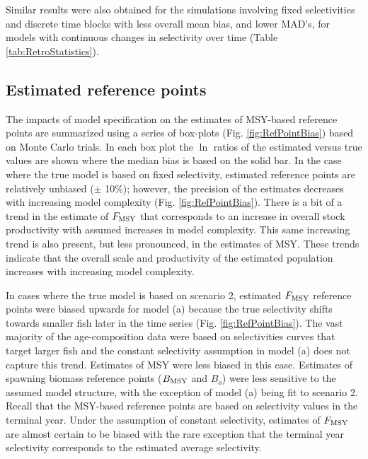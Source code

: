 Similar results were also obtained for the simulations involving fixed selectivities and discrete time blocks with less overall mean bias, and lower MAD's, for models with continuous changes in selectivity over time (Table \ref{tab:RetroStatistics}).




\subsection*{Estimated reference points} %
\label{sub:estimated_reference_points}


The impacts of model specification on the estimates of MSY-based reference points are summarized using a series of box-plots (Fig. \ref{fig:RefPointBias}) based on Monte Carlo trials.  In each box plot the $\ln$ ratios of the estimated versus true values are shown where the median bias is based on the solid bar.  In the case where the true model is based on fixed selectivity, estimated reference points are relatively unbiased ($\pm$ 10\%); however, the precision of the estimates decreases with increasing model complexity (Fig. \ref{fig:RefPointBias}).  There is a bit of a trend in the estimate of $F_{\rm{MSY}}$ that corresponds to an increase in overall stock productivity with assumed increases in model complexity.  This same increasing trend is also present, but less pronounced, in the estimates of MSY.  These trends indicate that the overall scale and productivity of the estimated population increases with increasing model complexity. 

In cases where the true model is based on scenario 2, estimated $F_{\rm{MSY}}$ reference points were biased upwards for model (a)  because the true selectivity shifts towards smaller fish later in the time series (Fig. \ref{fig:RefPointBias}). The vast majority of the age-composition data were based on selectivities curves that target larger fish and the constant selectivity assumption in model (a) does not capture this trend. Estimates of MSY were less biased in this case. Estimates of spawning biomass reference points ($B_{\rm{MSY}}$ and $B_o$) were less sensitive to the assumed model structure, with the exception of model (a) being fit to scenario 2. Recall that the MSY-based reference points are based on selectivity values in the terminal year. Under the assumption of constant selectivity, estimates of $F_{\rm{MSY}}$ are almost certain to be biased with the rare exception that the terminal year selectivity corresponds to the estimated average selectivity.  

